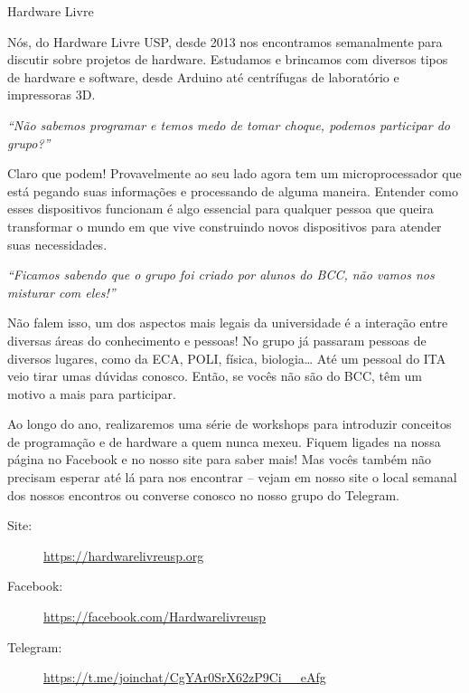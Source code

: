 \begin{subsecao}{Hardware Livre}


Nós, do Hardware Livre USP, desde 2013 nos encontramos semanalmente para
discutir sobre projetos de hardware. Estudamos e brincamos com diversos tipos de
hardware e software, desde Arduino até centrífugas de laboratório e impressoras
3D.

\textit{``Não sabemos programar e temos medo de tomar choque, podemos participar
do grupo?''}

Claro que podem! Provavelmente ao seu lado agora tem um microprocessador que
está pegando suas informações e processando de alguma maneira. Entender como
esses dispositivos funcionam é algo essencial para qualquer pessoa que queira
transformar o mundo em que vive construindo novos dispositivos para atender
suas necessidades.

\textit{``Ficamos sabendo que o grupo foi criado por alunos do BCC, não vamos
nos misturar com eles!''}

Não falem isso, um dos aspectos mais legais da universidade é a interação entre
diversas áreas do conhecimento e pessoas! No grupo já passaram pessoas de
diversos lugares, como da ECA, POLI, física, biologia… Até um pessoal do ITA
veio tirar umas dúvidas conosco. Então, se vocês não são do BCC, têm um motivo a
mais para participar.

Ao longo do ano, realizaremos uma série de workshops para introduzir conceitos 
de programação e de hardware a quem nunca mexeu. Fiquem ligades na nossa página 
no Facebook e no nosso site para saber mais! Mas vocês também não precisam 
esperar até lá para nos encontrar -- vejam em nosso site o local semanal dos 
nossos encontros ou converse conosco no nosso grupo do Telegram.

\begin{description}
  \item[Site:] \url{https://hardwarelivreusp.org}
  \item[Facebook:] \url{https://facebook.com/Hardwarelivreusp}
  \item[Telegram:] \url{https://t.me/joinchat/CgYAr0SrX62zP9Ci__eAfg}
\end{description}

\end{subsecao}
